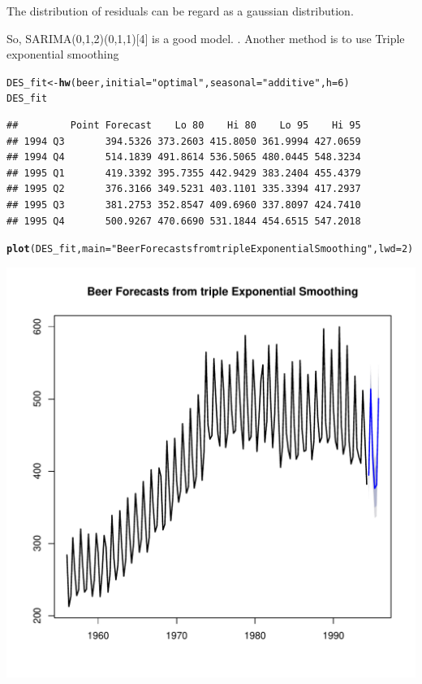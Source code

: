 \documentclass[10pt]{article}\usepackage[]{graphicx}\usepackage[]{color}
\makeatletter
\def\maxwidth{ %
  \ifdim\Gin@nat@width>\linewidth
    \linewidth
  \else
    \Gin@nat@width
  \fi
}
\newcommand{\hlnum}[1]{\textcolor[rgb]{0.686,0.059,0.569}{#1}}%
\newcommand{\hlstr}[1]{\textcolor[rgb]{0.192,0.494,0.8}{#1}}%
\newcommand{\hlstd}[1]{\textcolor[rgb]{0.345,0.345,0.345}{#1}}%
\newcommand{\hlkwb}[1]{\textcolor[rgb]{0.69,0.353,0.396}{#1}}%
\newcommand{\hlkwc}[1]{\textcolor[rgb]{0.333,0.667,0.333}{#1}}%
\newcommand{\hlkwd}[1]{\textcolor[rgb]{0.737,0.353,0.396}{\textbf{#1}}}%
\newenvironment{kframe}{%
 \def\at@end@of@kframe{}%
 \ifinner\ifhmode%
  \def\at@end@of@kframe{\end{minipage}}%
  \begin{minipage}{\columnwidth}%
 \fi\fi%
 \def\FrameCommand##1{\hskip\@totalleftmargin \hskip-\fboxsep
 \colorbox{shadecolor}{##1}\hskip-\fboxsep
     \hskip-\linewidth \hskip-\@totalleftmargin \hskip\columnwidth}%
 \MakeFramed {\advance\hsize-\width
   \@totalleftmargin\z@ \linewidth\hsize
   \@setminipage}}%
 {\par\unskip\endMakeFramed%
 \at@end@of@kframe}
\newenvironment{knitrout}{}{} %
\makeatother
\begin{document}
The distribution of residuals can be regard as a gaussian distribution.

So, SARIMA(0,1,2)(0,1,1)[4] is a good model.
. Another method is to use Triple exponential smoothing
\begin{knitrout}
\color{fgcolor}\begin{kframe}
\begin{alltt}
\hlstd{DES_fit} \hlkwb{<-} \hlkwd{hw}\hlstd{(beer,} \hlkwc{initial} \hlstd{=} \hlstr{"optimal"}\hlstd{,} \hlkwc{seasonal} \hlstd{=} \hlstr{"additive"}\hlstd{,} \hlkwc{h} \hlstd{=} \hlnum{6}\hlstd{)}
\hlstd{DES_fit}
\end{alltt}
\begin{verbatim}
##         Point Forecast    Lo 80    Hi 80    Lo 95    Hi 95
## 1994 Q3       394.5326 373.2603 415.8050 361.9994 427.0659
## 1994 Q4       514.1839 491.8614 536.5065 480.0445 548.3234
## 1995 Q1       419.3392 395.7355 442.9429 383.2404 455.4379
## 1995 Q2       376.3166 349.5231 403.1101 335.3394 417.2937
## 1995 Q3       381.2753 352.8547 409.6960 337.8097 424.7410
## 1995 Q4       500.9267 470.6690 531.1844 454.6515 547.2018
\end{verbatim}
\begin{alltt}
\hlkwd{plot}\hlstd{(DES_fit,}\hlkwc{main} \hlstd{=} \hlstr{"Beer Forecasts from triple Exponential Smoothing"}\hlstd{,} \hlkwc{lwd} \hlstd{=} \hlnum{2}\hlstd{)}
\end{alltt}
\end{kframe}
\includegraphics[width=\maxwidth]{figure/unnamed-chunk-21-1} 

\end{knitrout}
\end{document}
